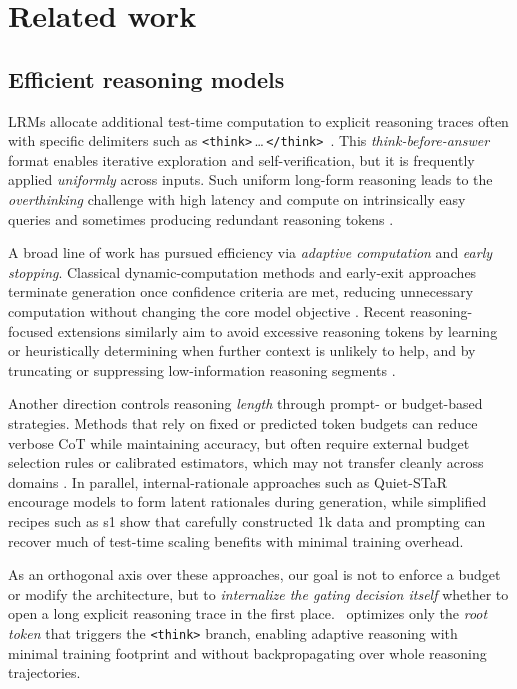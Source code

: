 \section{Related work}\label{sec:related}

\subsection{Efficient reasoning models}
LRMs allocate additional test-time computation to explicit reasoning traces often with specific delimiters such as \texttt{<think>}\,\ldots\,\texttt{</think>}~\cite{guo2025deepseek, jaech2024openai}. This \emph{think-before-answer} format enables iterative exploration and self-verification, but it is frequently applied \emph{uniformly} across inputs. Such uniform long-form reasoning leads to the \emph{overthinking} challenge with high latency and compute on intrinsically easy queries and sometimes producing redundant reasoning tokens \cite{feng2025efficient, sui2025stop}.

A broad line of work has pursued efficiency via \emph{adaptive computation} and \emph{early stopping}. Classical dynamic-computation methods and early-exit approaches terminate generation once confidence criteria are met, reducing unnecessary computation without changing the core model objective \cite{schuster2022confident, bae2025mixture}. Recent reasoning-focused extensions similarly aim to avoid excessive reasoning tokens by learning or heuristically determining when further context is unlikely to help, and by truncating or suppressing low-information reasoning segments \cite{sui2025stop}.

Another direction controls reasoning \emph{length} through prompt- or budget-based strategies. Methods that rely on fixed or predicted token budgets can reduce verbose CoT while maintaining accuracy, but often require external budget selection rules or calibrated estimators, which may not transfer cleanly across domains \cite{han2024token}. In parallel, internal-rationale approaches such as Quiet-STaR \cite{zelikman2024quiet} encourage models to form latent rationales during generation, while simplified recipes such as s1 \cite{muennighoff2025s1} show that carefully constructed 1k data and prompting can recover much of test-time scaling benefits with minimal training overhead.

As an orthogonal axis over these approaches, our goal is not to enforce a budget or modify the architecture, but to \emph{internalize the gating decision itself} whether to open a long explicit reasoning trace in the first place. \Ours~optimizes only the \emph{root token} that triggers the \texttt{<think>} branch, enabling adaptive reasoning with minimal training footprint and without backpropagating over whole reasoning trajectories.

